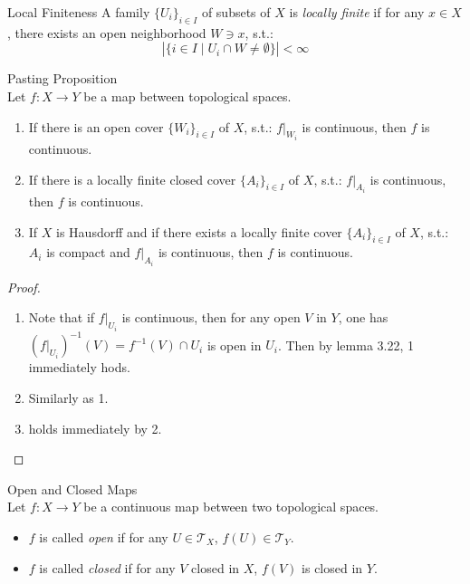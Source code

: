 \begin{definition}{Local Finiteness}
A family $\{ U_i \}_{i \in I}$ of subsets of $X$ is \textit{locally finite} if for any $x \in X$, there exists an open neighborhood $W \ni x$, s.t.:
$$|\{ i \in I \mid U_i \cap W \neq \emptyset \}| < \infty$$
\end{definition}

\begin{proposition}{Pasting Proposition}\\
Let $f: X \to Y$ be a map between topological spaces.
\begin{enumerate}
    \item If there is an open cover $\{ W_i \}_{i \in I}$ of $X$, s.t.: $f |_{W_i}$ is continuous, then $f$ is continuous.

    \item If there is a locally finite closed cover $\{A_i\}_{i \in I}$ of $X$, s.t.: $f|_{A_i}$ is continuous, then $f$ is continuous.

    \item If $X$ is Hausdorff and if there exists a locally finite cover $\{ A_i\}_{i \in I}$ of $X$, s.t.: $A_i$ is compact and $f|_{A_i}$ is continuous, then $f$ is continuous.
\end{enumerate}
\end{proposition}

\begin{proof}
    \begin{enumerate}
        \item Note that if $f|_{U_i}$ is continuous, then for any open $V$ in $Y$, one has $(f|_{U_i})^{-1} (V) = f^{-1} (V) \cap U_i$ is open in $U_i$. Then by lemma 3.22, 1 immediately hods.

        \item Similarly as 1.

        \item holds immediately by 2.
    \end{enumerate}
\end{proof}

\begin{definition}{Open and Closed Maps}\\
Let $f: X \to Y$ be a continuous map between two topological spaces.
\begin{itemize}
    \item $f$ is called \textit{open} if for any $U \in \mathcal{T}_X$, $f(U) \in \mathcal{T}_Y$.
    \item $f$ is called \textit{closed} if for any $V$ closed in $X$, $f(V)$ is closed in $Y$.
\end{itemize}
\end{definition}

